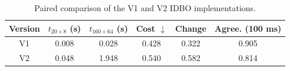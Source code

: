 \begin{table}[!t]
\centering
\footnotesize
\setlength{\tabcolsep}{2.0pt}
\caption{Paired comparison of the V1 and V2 IDBO implementations.}
\label{tab:idbo_v1_v2}
\begin{tabular}{@{}cccccc@{}}
\hline\hline
Version & $t_{20\times8}$ (s) & $t_{160\times64}$ (s) & Cost $\downarrow$ & Change & Agree. (100 ms) \\
\hline
V1 & 0.008 & 0.028 & 0.428 & 0.322 & 0.905 \\
V2 & 0.048 & 1.948 & 0.540 & 0.582 & 0.814 \\
\hline
\end{tabular}
\end{table}
